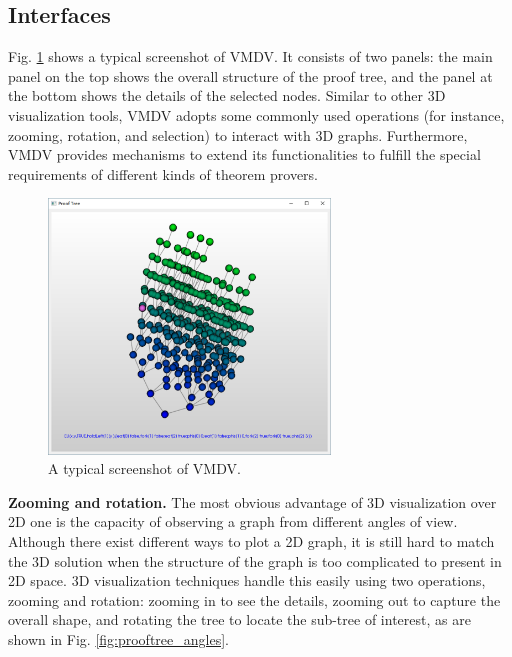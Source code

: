 \documentclass[runningheads]{llncs}
\newcommand\tool[1]{\textsf{#1}}
\newcommand\vmdv{\tool{VMDV}}
\begin{document}
 
\subsection{Interfaces}
Fig. \ref{fig:screenshot} shows a typical screenshot of \textsf{VMDV}. It consists of two panels: the main panel on the top shows the overall structure of the proof tree, and the panel at the bottom shows the details of the selected nodes.
Similar to other 3D visualization tools, \vmdv{} adopts some commonly used operations (for instance, zooming, rotation, and selection) to interact with 3D graphs. Furthermore, \vmdv{} provides mechanisms to extend its functionalities to fulfill the special requirements of different kinds of theorem provers.
\begin{figure}[h]
\centering
\includegraphics[width=7.5cm]{./050407.png}
\caption{A typical screenshot of \textsf{VMDV}.}
\label{fig:screenshot}
\end{figure}
\smallskip

\hspace{-0.5cm}
{\bf Zooming and rotation.}
The most obvious advantage of 3D visualization over 2D one is the capacity of observing a graph from different angles of view. Although there exist different ways to plot a 2D graph, it is still hard to match the 3D solution when the structure of the graph is too complicated to present in 2D space. 3D visualization techniques handle this easily using two operations, zooming and rotation: zooming in to see the details, zooming out to capture the overall shape, and rotating the tree to locate the sub-tree of interest, as are shown in Fig. \ref{fig:prooftree_angles}.
 
\end{document}
